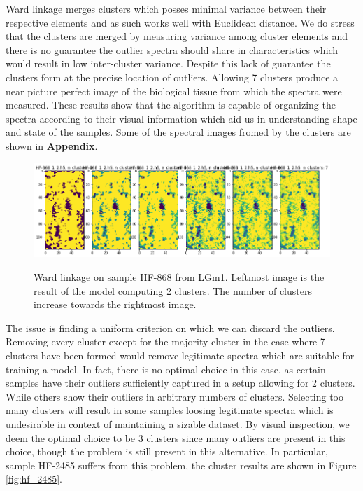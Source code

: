 Ward linkage merges clusters which posses minimal variance between their respective elements and as such works well with Euclidean distance. We do stress that the clusters are merged by measuring variance among cluster elements and there is no guarantee the outlier spectra should share in characteristics which would result in low inter-cluster variance. Despite this lack of guarantee the clusters form at the precise location of outliers. Allowing 7 clusters produce a near picture perfect image of the biological tissue from which the spectra were measured. These results show that the algorithm is capable of organizing the spectra according to their visual information which aid us in understanding shape and state of the samples. Some of the spectral images fromed by the clusters are shown in \textbf{Appendix}.

\begin{figure}[H]

    \centering
{\includegraphics[width=15cm]{images/Ward_linkage/LGm-1/HF-868_1_2.h5_0.png} }
\caption{Ward linkage on sample HF-868 from LGm1. Leftmost image is the result of the model computing 2 clusters. The number of clusters increase towards the rightmost image.\label{fig:SL_HF868}}%

\end{figure}


The issue is finding a uniform criterion on which we can discard the outliers. Removing every cluster except for the majority cluster in the case where 7 clusters have been formed would remove legitimate spectra which are suitable for training a model. In fact, there is no optimal choice in this case, as certain samples have their outliers sufficiently captured in a setup allowing for 2 clusters. While others show their outliers in arbitrary numbers of clusters. Selecting too many clusters will result in some samples loosing legitimate spectra which is undesirable in context of maintaining a sizable dataset. By visual inspection, we deem the optimal choice to be 3 clusters since many outliers are present in this choice, though the problem is still present in this alternative. In particular, sample HF-2485 suffers from this problem, the cluster results are shown in Figure \ref{fig:hf_2485}.


